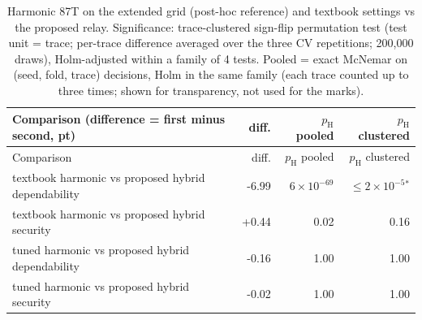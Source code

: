 \begin{longtable}{@{}p{8.6cm}rrr@{}}
\caption{Harmonic 87T on the extended grid (post-hoc reference) and textbook settings vs the proposed relay. Significance: trace-clustered sign-flip permutation test (test unit = trace; per-trace difference averaged over the three CV repetitions; 200{,}000 draws), Holm-adjusted within a family of 4 tests. Pooled = exact McNemar on (seed, fold, trace) decisions, Holm in the same family (each trace counted up to three times; shown for transparency, not used for the marks).}\label{tab:S8}\\
\toprule Comparison (difference = first minus second, pt) & diff. & $p_{\mathrm{H}}$ pooled & $p_{\mathrm{H}}$ clustered \\ \midrule \endfirsthead
\toprule Comparison & diff. & $p_{\mathrm{H}}$ pooled & $p_{\mathrm{H}}$ clustered \\ \midrule \endhead
textbook harmonic vs proposed hybrid dependability & -6.99 & $6\times10^{-69}$ & $\le 2\times10^{-5}$$^{*}$ \\
textbook harmonic vs proposed hybrid security & +0.44 & 0.02 & 0.16 \\
tuned harmonic vs proposed hybrid dependability & -0.16 & 1.00 & 1.00 \\
tuned harmonic vs proposed hybrid security & -0.02 & 1.00 & 1.00 \\
\bottomrule
\end{longtable}